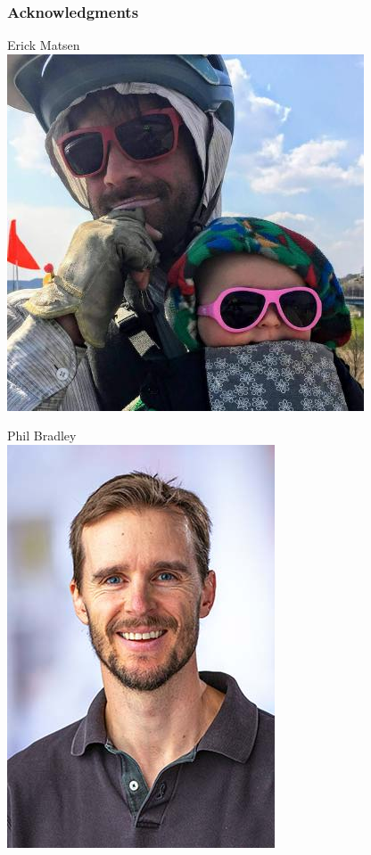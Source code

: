 \documentclass[mathserif,compress,xcolor={dvipsnames}]{beamer}
\renewcommand\;{\,}
\begin{document}
\begin{frame}\frametitle{Acknowledgments}
\begin{minipage}{0.49\linewidth}
\begin{center}
Erick Matsen
\\
\includegraphics[width=0.5\linewidth]{Images/Erick.jpeg}
\end{center}
\end{minipage}
\begin{minipage}{0.49\linewidth}
\begin{center}
Phil Bradley
\\
\includegraphics[width=0.4\linewidth]{Images/Phil.jpg}
\end{center}
\end{minipage}
\end{frame}
\end{document}
